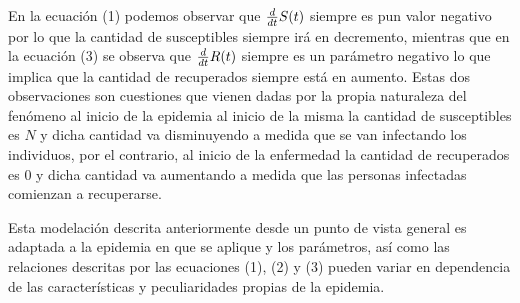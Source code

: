\documentclass{article}
\begin{document}
En la ecuación (1) podemos observar que ${d\over dt}S(t)$ siempre es pun valor negativo por lo que la cantidad de susceptibles siempre irá en decremento, mientras que en la ecuación (3) se observa que ${d\over dt}R(t)$ siempre es un parámetro negativo lo que implica que la cantidad de recuperados siempre está en aumento. Estas dos observaciones son cuestiones que vienen dadas por la propia naturaleza del fenómeno al inicio de la epidemia al inicio de la misma la cantidad de susceptibles es $N$ y dicha cantidad va disminuyendo a medida que se van infectando los individuos, por el contrario, al inicio de la enfermedad la cantidad de recuperados es 0 y dicha cantidad va aumentando a medida que las personas infectadas comienzan a recuperarse.

Esta modelación descrita anteriormente desde un punto de vista general es
adaptada a la epidemia en que se aplique y los parámetros, así como las relaciones descritas por las ecuaciones (1), (2) y (3) pueden variar en dependencia de las características y peculiaridades propias de la epidemia.    

    
    
\end{document}
